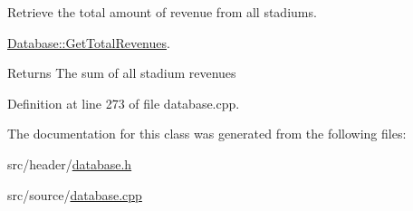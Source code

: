 Retrieve the total amount of revenue from all stadiums. 

\hyperlink{class_database_ac4b525f1a61d1b4fd11c81bd3b2c92b0}{Database\+::\+Get\+Total\+Revenues}.

\begin{DoxyReturn}{Returns}
The sum of all stadium revenues 
\end{DoxyReturn}


Definition at line 273 of file database.\+cpp.



The documentation for this class was generated from the following files\+:\begin{DoxyCompactItemize}
\item 
src/header/\hyperlink{database_8h}{database.\+h}\item 
src/source/\hyperlink{database_8cpp}{database.\+cpp}\end{DoxyCompactItemize}
